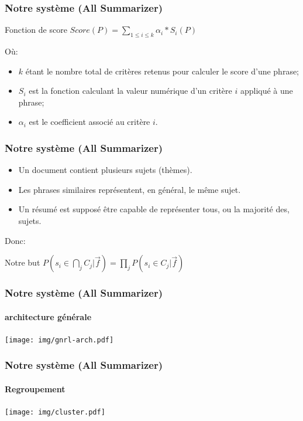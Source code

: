 \documentclass{beamer}
\begin{document}
\begin{frame}
\frametitle{Notre système (All Summarizer)}

\begin{block}{Fonction de score}
$Score(P) = \sum_{1 \leq i \leq k} {\alpha_i * S_i(P)}$
\end{block}

Où:
\begin{itemize}
\item $k$ étant le nombre total de critères retenus pour calculer le score d'une phrase;
\item $S_i$ est la fonction calculant la valeur numérique d'un critère $ i $ appliqué à une phrase;
\item $\alpha_i$ est le coefficient associé au critère $ i $.
\end{itemize}

\end{frame}

\begin{frame}
\frametitle{Notre système (All Summarizer)}

\begin{itemize}
\item Un document contient plusieurs sujets (thèmes).
\item Les phrases similaires représentent, en général, le même sujet.
\item Un résumé est supposé être capable de représenter tous, ou la majorité des, sujets.
\end{itemize}
Donc:
\begin{block}{Notre but}
$ P(s_i \in \bigcap_{j} C_j | \overrightarrow{f}) = 
\prod_{j} P(s_i \in C_j | \overrightarrow{f}) $
\end{block}

\end{frame}

\begin{frame}
\frametitle{Notre système (All Summarizer)}
\framesubtitle{architecture générale}
\begin{center}
\texttt{[image: img/gnrl-arch.pdf]}
\end{center}
\end{frame}

\begin{frame}
\frametitle{Notre système (All Summarizer)}
\framesubtitle{Regroupement}
\begin{center}
\texttt{[image: img/cluster.pdf]}
\end{center}
\end{frame}
\end{document}
